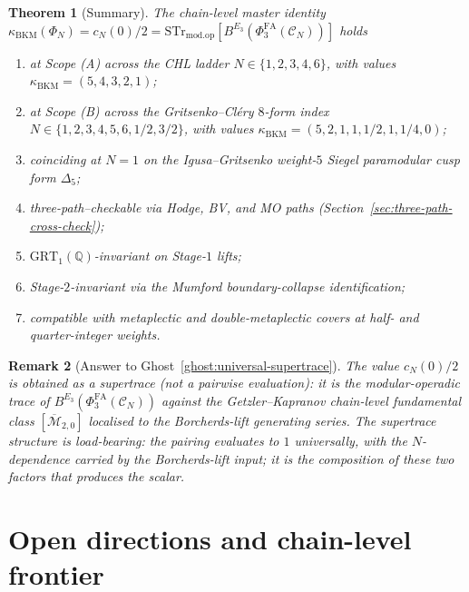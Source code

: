 \documentclass[11pt]{amsart}
\newtheorem{theorem}{Theorem}[section]
\newtheorem{remark}[theorem]{Remark}
\providecommand{\Q}{\mathbb{Q}}
\providecommand{\cC}{\mathcal{C}}
\providecommand{\GRT}{\mathrm{GRT}}
\providecommand{\PhiFA}{\Phi^{\mathrm{FA}}}
\providecommand{\Mbar}{\overline{\mathcal{M}}}
\providecommand{\STr}{\mathrm{STr}}
\providecommand{\modop}{\mathrm{mod.op}}
\providecommand{\kBKM}{\kappa_{\mathrm{BKM}}}
\begin{document}
\begin{theorem}[Summary]
\label{thm:master-summary}
The chain-level master identity
$\kBKM(\Phi_N) = c_N(0)/2 = \STr_{\modop}[B^{E_3}(\PhiFA_3(\cC_N))]$
holds
\begin{enumerate}[label=\textup{(\roman*)}]
\item at Scope (A) across the CHL ladder $N \in \{1, 2, 3, 4, 6\}$,
with values $\kBKM = (5, 4, 3, 2, 1)$;
\item at Scope (B) across the Gritsenko--Cl\'ery $8$-form index
$N \in \{1, 2, 3, 4, 5, 6, 1/2, 3/2\}$, with values
$\kBKM = (5, 2, 1, 1, 1/2, 1, 1/4, 0)$;
\item coinciding at $N = 1$ on the Igusa--Gritsenko weight-$5$
Siegel paramodular cusp form $\Delta_5$;
\item three-path--checkable via Hodge, BV, and MO paths
(Section~\ref{sec:three-path-cross-check});
\item $\GRT_1(\Q)$-invariant on Stage-$1$ lifts;
\item Stage-$2$-invariant via the Mumford boundary-collapse
identification;
\item compatible with metaplectic and double-metaplectic covers at
half- and quarter-integer weights.
\end{enumerate}
\end{theorem}

\begin{remark}[Answer to Ghost~\ref{ghost:universal-supertrace}]
The value $c_N(0)/2$ is obtained as a supertrace (not a pairwise
evaluation): it is the modular-operadic trace of
$B^{E_3}(\PhiFA_3(\cC_N))$ against the Getzler--Kapranov chain-level
fundamental class $[\Mbar_{2, 0}]$ localised to the Borcherds-lift
generating series. The supertrace structure is load-bearing: the
pairing evaluates to $1$ universally, with the
$N$-dependence carried by the Borcherds-lift input; it is the
composition of these two factors that produces the scalar.
\end{remark}

\section{Open directions and chain-level frontier}
\label{sec:open-directions}
\end{document}
